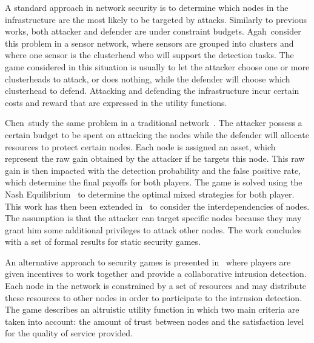  A standard approach in network security is to determine which nodes in the infrastructure are the most likely to be targeted by attacks. 
 Similarly to previous works, both attacker and defender are under constraint budgets.
 Agah~\etal consider this problem in a sensor network, where sensors are grouped into clusters and where one sensor is the clusterhead who will support the detection tasks.
 The game considered in this situation is usually to let the attacker choose one or more clusterheads to attack, or does nothing, while the defender will choose which clusterhead to defend.
 Attacking and defending the infrastructure incur certain costs and reward that are expressed in the utility functions.
 
 Chen~\etal study the same problem in a traditional network~\cite{Chen2009}. The attacker possess a certain budget to be spent on attacking the nodes while the defender will allocate resources to protect certain nodes.
 Each node is assigned an asset, which represent the raw gain obtained by the attacker if he targets this node.
 This raw gain is then impacted with the detection probability and the false positive rate, which determine the final payoffs for both players.
 The game is solved using the Nash Equilibrium~\cite{nasheq} to determine the optimal mixed strategies for both player.
 This work has then been extended in~\cite{interdep-ismail2017} to consider the interdependencies of nodes.
 The assumption is that the attacker can target specific nodes because they may grant him some additional privileges to attack other nodes.
 The work concludes with a set of formal results for static security games.
 
 An alternative approach to security games is presented in~\cite{Zhu2009b} where players are given incentives to work together and provide a collaborative intrusion detection.
 Each node in the network is constrained by a set of resources and may distribute these resources to other nodes in order to participate to the intrusion detection.
 The game describes an altruistic utility function in which two main criteria are taken into account: the amount of trust between nodes and the satisfaction level for the quality of service provided.

